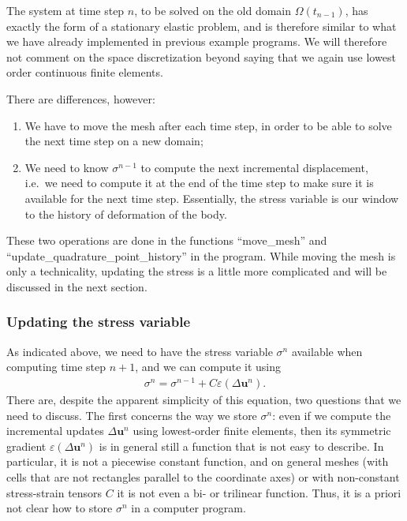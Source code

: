 \documentclass{article}
\renewcommand{\vec}[1]{\mathbf{#1}}
\begin{document}
The system at time step $n$, to be solved on the old domain
$\Omega(t_{n-1})$, has exactly the form of a stationary elastic
problem, and is therefore similar to what we have already implemented
in previous example programs. We will therefore not comment on the
space discretization beyond saying that we again use lowest order
continuous finite elements.

There are differences, however:
\begin{enumerate}
  \item We have to move the mesh after each time step, in order to be
  able to solve the next time step on a new domain;

  \item We need to know $\sigma^{n-1}$ to compute the next incremental
  displacement, i.e.~we need to compute it at the end of the time step
  to make sure it is available for the next time step. Essentially,
  the stress variable is our window to the history of deformation of
  the body.
\end{enumerate}
These two operations are done in the functions ``move\_mesh'' and
``update\_\-quadrature\_\-point\_history'' in the program. While moving
the mesh is only a technicality, updating the stress is a little more
complicated and will be discussed in the next section.


\subsubsection*{Updating the stress variable}

As indicated above, we need to have the stress variable $\sigma^n$ available
when computing time step $n+1$, and we can compute it using
\begin{gather}
  \label{eq:stress-update}
  \sigma^n = \sigma^{n-1} + C \varepsilon (\Delta \vec u^n).  
\end{gather}
There are, despite the apparent simplicity of this equation, two questions
that we need to discuss. The first concerns the way we store $\sigma^n$: even
if we compute the incremental updates $\Delta\vec u^n$ using lowest-order
finite elements, then its symmetric gradient $\varepsilon(\Delta\vec u^n)$ is
in general still a function that is not easy to describe. In particular, it is
not a piecewise constant function, and on general meshes (with cells that are
not rectangles parallel to the coordinate axes) or with non-constant
stress-strain tensors $C$ it is not even a bi- or trilinear function. Thus, it
is a priori not clear how to store $\sigma^n$ in a computer program.
\end{document}
